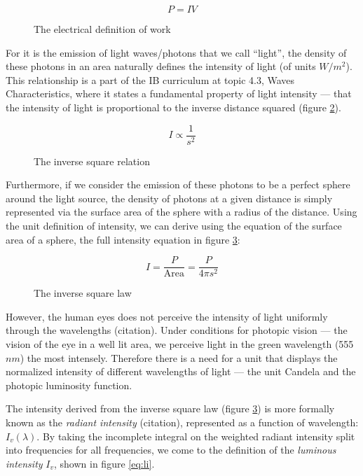 \documentclass[a4paper,12pt]{article}
\begin{document}
\begin{figure}[h!]
    \[
    P = IV
    \]
    \caption{The electrical definition of work}
    \label{eq:work}
\end{figure}

For it is the emission of light waves/photons that we call ``light'', the density of these photons in an area naturally defines the intensity of light (of units $\si{W\per m^2}$). This relationship is a part of the IB curriculum at topic 4.3, Waves Characteristics, where it states a fundamental property of light intensity --- that the intensity of light is proportional to the inverse distance squared (figure \ref{eq:prop}).

\begin{figure}[h!]
    \[
    I \propto \frac{1}{s^2}
    \]
    \caption{The inverse square relation}
    \label{eq:prop}
\end{figure}

Furthermore, if we consider the emission of these photons to be a perfect sphere around the light source, the density of photons at a given distance is simply represented via the surface area of the sphere with a radius of the distance.
Using the unit definition of intensity, we can derive using the equation of the surface area of a sphere, the full intensity equation in figure \ref{eq:isl}:

\begin{figure}[h!]
    \[
    I = \frac{P}{\text{Area}} = \frac{P}{4\pi s^2}
    \]
    \caption{The inverse square law}
    \label{eq:isl}
\end{figure}

However, the human eyes does not perceive the intensity of light uniformly through the wavelengths (citation). Under conditions for photopic vision --- the vision of the eye in a well lit area, we perceive light in the green wavelength (555 $\si{nm}$) the most intensely. Therefore there is a need for a unit that displays the normalized intensity of different wavelengths of light --- the unit Candela and the photopic luminosity function.

The intensity derived from the inverse square law (figure \ref{eq:isl}) is more formally known as the \textit{radiant intensity} (citation), represented as a function of wavelength: $I_v(\lambda)$. By taking the incomplete integral on the weighted radiant intensity split into frequencies for all frequencies, we come to the definition of the \textit{luminous intensity} $I_v$, shown in figure \ref{eq:li}.
\end{document}
